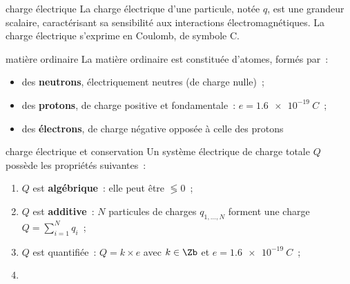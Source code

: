 \documentclass[../main/main.tex]{subfiles}
\begin{document}
\begin{tcbraster}[raster columns=2, raster equal height=rows]
    \begin{defi}[label=def:q, sidebyside]{charge électrique}
        La charge électrique d'une particule, notée $q$, est une grandeur
        scalaire, caractérisant sa sensibilité aux interactions
        électromagnétiques.
        \tcblower
        La charge électrique s'exprime en Coulomb, de symbole C.
    \end{defi}
    \begin{exem}[label=exem:q]{matière ordinaire}
        La matière ordinaire est constituée d'atomes, formés par~:
        \begin{itemize}
            \item des \textbf{neutrons}, électriquement neutres (de charge nulle)~;
            \item des \textbf{protons}, de charge positive et fondamentale~: $e =
                \SI{1.6e-19}{C}$~;
            \item des \textbf{électrons}, de charge négative opposée à celle des
                protons
        \end{itemize}
    \end{exem}
\end{tcbraster}
\begin{prop}[label=prop:q]{charge électrique et conservation}
    Un système électrique de charge totale $Q$ possède les propriétés
    suivantes~:
    \begin{enumerate}
        \item $Q$ est \textbf{algébrique}~: elle peut être $\lessgtr 0$~;
        \item $Q$ est \textbf{additive}~: $N$ particules de charges $q_{1, …,
            N}$ forment une charge $Q = \sum_{i=1}^{N} q_i$~;
        \item $Q$ est quantifiée~: $Q = k\times e$ avec $k \in \Zb$ et $e =
            \SI{1.6e-19}{C}$~;
        \item {}
    \end{enumerate}
\end{prop}
\end{document}
